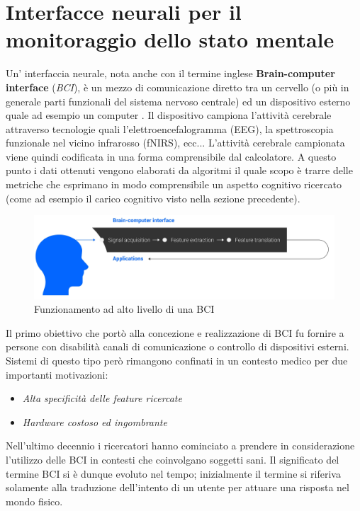 \section{Interfacce neurali per il monitoraggio dello stato mentale}
Un' interfaccia neurale, nota anche con il termine inglese {\bf Brain-computer interface} (\emph{BCI}), è un mezzo di comunicazione diretto tra un cervello (o più in generale parti funzionali del sistema nervoso centrale) ed un dispositivo esterno quale ad esempio un computer \cite{bci}.\newline
Il dispositivo campiona l’attività cerebrale attraverso tecnologie quali l'elettroencefalogramma (EEG), la spettroscopia funzionale nel vicino infrarosso (fNIRS), ecc...\newline
L'attività cerebrale campionata viene quindi codificata in una forma comprensibile dal calcolatore.\newline
A questo punto i dati ottenuti vengono elaborati da algoritmi il quale scopo è trarre delle metriche che esprimano in modo comprensibile un aspetto cognitivo ricercato (come ad esempio il carico cognitivo visto nella sezione precedente).\newline
\begin{figure}[H]
  \centering
  \includegraphics[width=1.0\textwidth]{img/BCI.jpg}
  \caption{Funzionamento ad alto livello di una BCI}
\end{figure}
\noindent Il primo obiettivo che portò alla concezione e realizzazione di BCI fu fornire a persone con disabilità canali di comunicazione o controllo di dispositivi esterni.\newline
Sistemi di questo tipo però rimangono confinati in un contesto medico per due importanti motivazioni:
\begin{itemize}
  \item \emph{Alta specificità delle feature ricercate}
  \item \emph{Hardware costoso ed ingombrante}
\end{itemize}
Nell'ultimo decennio i ricercatori hanno cominciato a prendere in considerazione l'utilizzo delle BCI in contesti che coinvolgano soggetti sani.\newline
Il significato del termine BCI si è dunque evoluto nel tempo; inizialmente il termine si riferiva solamente alla traduzione dell'intento di un utente per attuare una risposta nel mondo fisico.\newline

